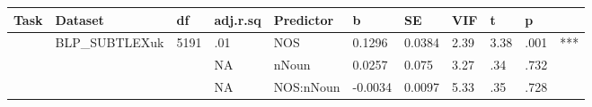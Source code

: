 \begin{table}[ht]
\centering
\begingroup\normalsize
\begin{tabular}{lllllllllll}
  \hline
Task & Dataset & df & adj.r.sq & Predictor & b & SE & VIF & t & p &  \\ 
  \hline
 & BLP\_SUBTLEXuk & 5191 & .01 & NOS & 0.1296 & 0.0384 & 2.39 & 3.38 & .001 & *** \\ 
   &  &  & NA & nNoun & 0.0257 & 0.075 & 3.27 & .34 & .732 &   \\ 
   &  &  & NA & NOS:nNoun & -0.0034 & 0.0097 & 5.33 & .35 & .728 &   \\ 
   \hline
\end{tabular}
\endgroup
\end{table}
